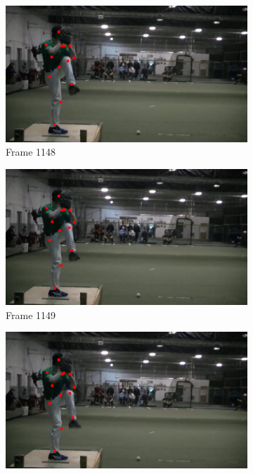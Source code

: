 \documentclass[./main.tex]{subfiles}
\begin{document}
\begin{figure}[htbp]
    \centering
    \begin{subfigure}{0.45\textwidth}
        \centering
        \includegraphics[width=\textwidth]{entities/PA_60.png}
        \caption{Frame 1148}
    \end{subfigure}
    \begin{subfigure}{0.45\textwidth}
        \centering
        \includegraphics[width=\textwidth]{entities/PA_61.png}
        \caption{Frame 1149}
    \end{subfigure}
    \begin{subfigure}{0.45\textwidth}
        \centering
        \includegraphics[width=\textwidth]{entities/PA_62.png}

\end{subfigure}
\end{figure}
\end{document}
